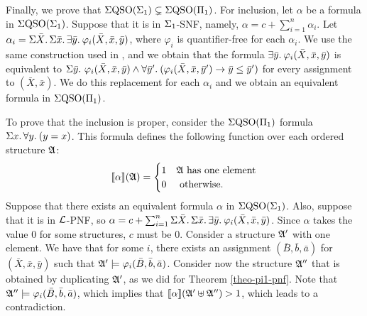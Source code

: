 Finally, we prove that $\Sigma{\rm QSO}(\Sigma_{1})\subsetneq\Sigma{\rm QSO}(\Pi_{1})$. For inclusion, let $\alpha$ be a formula in $\Sigma{\rm QSO}(\Sigma_{1})$. Suppose that it is in $\Sigma_{1}$-SNF, namely, $\alpha = c + \sum_{i = 1}^{n}\alpha_i$. Let $\alpha_i = \Sigma{\bar{X}}.\,\Sigma{\bar{x}}.\,\exists{\bar{y}}.\:\varphi_i(\bar{X},\bar{x},\bar{y})$, where $\varphi_i$ is quantifier-free for each $\alpha_i$. We use the same construction used in \cite{SalujaST95}, and we obtain that the formula $\exists{\bar{y}}.\:\varphi_i(\bar{X},\bar{x},\bar{y})$ is equivalent to $\Sigma{\bar{y}}.\,\,\varphi_i(\bar{X},\bar{x},\bar{y}) \wedge \forall{\bar{y}'}.\:(\varphi_i(\bar{X},\bar{x},\bar{y}')\to\bar{y}\leq\bar{y}')$ for every assignment to $(\bar{X},\bar{x})$. We do this replacement for each $\alpha_i$ and we obtain an equivalent formula in $\Sigma{\rm QSO}(\Pi_{1})$.

To prove that the inclusion is proper, consider the $\Sigma{\rm QSO}(\Pi_{1})$ formula $\Sigma{x}.\, \forall{y}.\:(y = x)$. This formula defines the following function over each ordered structure $\mathfrak{A}$:
$$
{\llbracket{}{\alpha}\rrbracket}(\mathfrak{A}) = 
\begin{cases}
1 &\mathfrak{A} \text{ has one element}\\
0 &\text{ otherwise}.
\end{cases}
$$
Suppose that there exists an equivalent formula $\alpha$ in $\Sigma{\rm QSO}(\Sigma_{1})$. Also, suppose that it is in $\mathcal{L}$-PNF, so $\alpha = c + \sum_{i = 1}^n\Sigma{\bar{X}}.\,\Sigma{\bar{x}}.\,\exists{\bar{y}}.\:\varphi_i(\bar{X},\bar{x},\bar{y})$. Since $\alpha$ takes the value 0 for some structures, $c$ must be 0. Consider a structure $\mathfrak{A}'$ with one element. We have that for some $i$, there exists an assignment $(\bar{B},\bar{b},\bar{a})$ for $(\bar{X},\bar{x},\bar{y})$ such that $\mathfrak{A}' \models\varphi_i(\bar{B},\bar{b},\bar{a})$. Consider now the structure $\mathfrak{A}''$ that is obtained by duplicating $\mathfrak{A}'$, as we did for Theorem \ref{theo-pi1-pnf}. Note that $\mathfrak{A}''\models\varphi_i(\bar{B},\bar{b},\bar{a})$, which implies that ${\llbracket{}{\alpha}\rrbracket}(\mathfrak{A}' \uplus \mathfrak{A}'') > 1$, which leads to a contradiction.